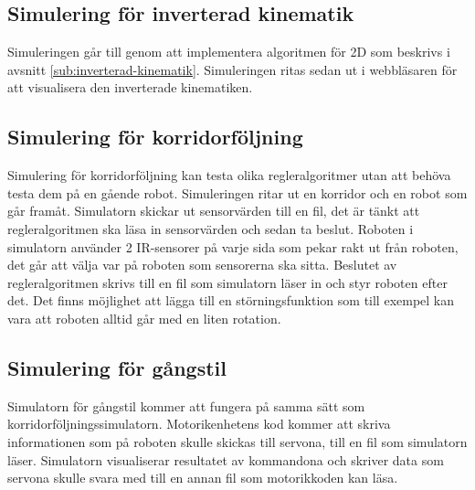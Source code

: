 \documentclass[a4paper,titlepage,12pt]{article}
\begin{document}
	\subsection{Simulering för inverterad kinematik}
	Simuleringen går till genom att implementera algoritmen för 2D som beskrivs i avsnitt \ref{sub:inverterad-kinematik}. Simuleringen ritas sedan ut i webbläsaren för att visualisera den inverterade kinematiken.
	
	\subsection{Simulering för korridorföljning}
	Simulering för korridorföljning kan testa olika regleralgoritmer utan att behöva testa 
	dem på en gående robot. Simuleringen ritar ut en korridor och en robot som går framåt. 
	Simulatorn skickar ut sensorvärden till en fil, det är tänkt att regleralgoritmen ska 
	läsa in sensorvärden och sedan ta beslut. Roboten i simulatorn använder 2 IR-sensorer på varje 
	sida som pekar rakt ut från roboten, det går att välja var på roboten som sensorerna ska 
	sitta. Beslutet av regleralgoritmen skrivs till en fil som simulatorn läser in och 
	styr roboten efter det. Det finns möjlighet att lägga till en störningsfunktion som till 
	exempel kan vara att roboten alltid går med en liten rotation. 
	
	\subsection{Simulering för gångstil}
	Simulatorn för gångstil kommer att fungera på samma sätt som 
	korridorföljningssimulatorn. Motorikenhetens kod kommer att skriva informationen som
	på roboten skulle skickas till servona, till en fil som simulatorn läser. Simulatorn
	visualiserar resultatet av kommandona och skriver data som servona skulle svara
	med till en annan fil som motorikkoden kan läsa.
\end{document}
